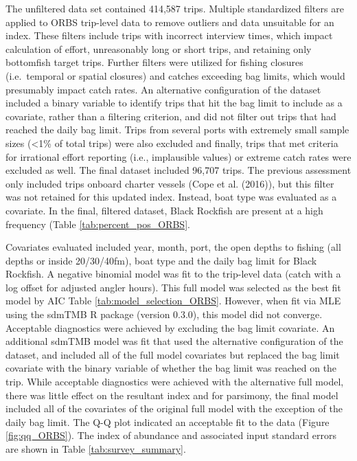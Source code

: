 \documentclass[11pt,
  letterpaper,
]{article}
\begin{document}
The unfiltered data set contained 414,587 trips. Multiple standardized filters are applied to ORBS trip-level data to remove outliers and data unsuitable for an index. These filters include trips with incorrect interview times, which impact calculation of effort, unreasonably long or short trips, and retaining only bottomfish target trips. Further filters were utilized for fishing closures (i.e.~temporal or spatial closures) and catches exceeding bag limits, which would presumably impact catch rates. An alternative configuration of the dataset included a binary variable to identify trips that hit the bag limit to include as a covariate, rather than a filtering criterion, and did not filter out trips that had reached the daily bag limit. Trips from several ports with extremely small sample sizes (\textless1\% of total trips) were also excluded and finally, trips that met criteria for irrational effort reporting (i.e., implausible values) or extreme catch rates were excluded as well. The final dataset included 96,707 trips. The previous assessment only included trips onboard charter vessels (Cope et al. (2016)), but this filter was not retained for this updated index. Instead, boat type was evaluated as a covariate. In the final, filtered dataset, Black Rockfish are present at a high frequency (Table \ref{tab:percent_pos_ORBS}.

Covariates evaluated included year, month, port, the open depths to fishing (all depths or inside 20/30/40fm), boat type and the daily bag limit for Black Rockfish. A negative binomial model was fit to the trip-level data (catch with a log offset for adjusted angler hours). This full model was selected as the best fit model by AIC Table \ref{tab:model_selection_ORBS}. However, when fit via MLE using the sdmTMB R package (version 0.3.0), this model did not converge. Acceptable diagnostics were achieved by excluding the bag limit covariate. An additional sdmTMB model was fit that used the alternative configuration of the dataset, and included all of the full model covariates but replaced the bag limit covariate with the binary variable of whether the bag limit was reached on the trip. While acceptable diagnostics were achieved with the alternative full model, there was little effect on the resultant index and for parsimony, the final model included all of the covariates of the original full model with the exception of the daily bag limit. The Q-Q plot indicated an acceptable fit to the data (Figure \ref{fig:qq_ORBS}). The index of abundance and associated input standard errors are shown in Table \ref{tab:survey_summary}.
\end{document}
